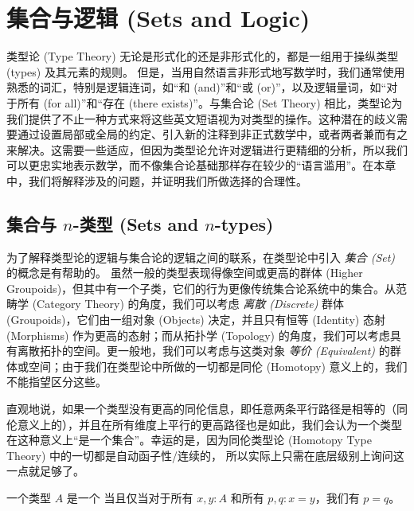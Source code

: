 \chapter{集合与逻辑 (Sets and Logic)}
\label{cha:logic}

类型论 (Type Theory) 无论是形式化的还是非形式化的，都是一组用于操纵类型 (types) 及其元素的规则。
但是，当用自然语言非形式地写数学时，我们通常使用熟悉的词汇，特别是逻辑连词，如“和 (and)”和“或 (or)”，以及逻辑量词，如“对于所有 (for all)”和“存在 (there exists)”。与集合论 (Set Theory) 相比，类型论为我们提供了不止一种方式来将这些英文短语视为对类型的操作。这种潜在的歧义需要通过设置局部或全局的约定、引入新的注释到非正式数学中，或者两者兼而有之来解决。这需要一些适应，但因为类型论允许对逻辑进行更精细的分析，所以我们可以更忠实地表示数学，而不像集合论基础那样存在较少的“语言滥用”。在本章中，我们将解释涉及的问题，并证明我们所做选择的合理性。

\section{集合与 \texorpdfstring{$n$}{n}-类型 (Sets and \texorpdfstring{$n$}{n}-types)}
\label{sec:basics-sets}

%

为了解释类型论的逻辑与集合论的逻辑之间的联系，在类型论中引入 \emph{集合 (Set)} 的概念是有帮助的。
虽然一般的类型表现得像空间或更高的群体 (Higher Groupoids)，但其中有一个子类，它们的行为更像传统集合论系统中的集合。从范畴学 (Category Theory) 的角度，我们可以考虑 \emph{离散 (Discrete)} 群体 (Groupoids)，它们由一组对象 (Objects) 决定，并且只有恒等 (Identity) 态射 (Morphisms) 作为更高的态射；而从拓扑学 (Topology) 的角度，我们可以考虑具有离散拓扑的空间。更一般地，我们可以考虑与这类对象 \emph{等价 (Equivalent)} 的群体或空间；由于我们在类型论中所做的一切都是同伦 (Homotopy) 意义上的，我们不能指望区分这些。

直观地说，如果一个类型没有更高的同伦信息，即任意两条平行路径是相等的（同伦意义上的），并且在所有维度上平行的更高路径也是如此，我们会认为一个类型在这种意义上“是一个集合”。幸运的是，因为同伦类型论 (Homotopy Type Theory) 中的一切都是自动函子性/连续的，
%
%
所以实际上只需在底层级别上询问这一点就足够了。

\begin{defn}\label{defn:set}
一个类型 $A$ 是一个  当且仅当对于所有 $x,y:A$ 和所有 $p,q:x=y$，我们有 $p=q$。
\end{defn}

